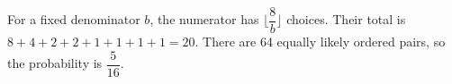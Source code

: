 For a fixed denominator $b$, the numerator has $\lfloor\dfrac{8}{b}\rfloor$ choices. Their total is $8+4+2+2+1+1+1+1=20$. There are 64 equally likely ordered pairs, so the probability is $\boxed{\dfrac{5}{16}}$.
